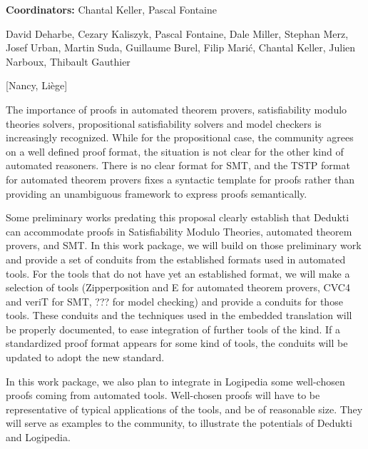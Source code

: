 {\bf Coordinators:} Chantal Keller, Pascal Fontaine

David Deharbe,
Cezary Kaliszyk,
Pascal Fontaine, Dale Miller, Stephan Merz, Josef Urban, Martin Suda,
Guillaume Burel, Filip Marić, Chantal Keller, Julien Narboux, Thibault Gauthier

[Nancy, Liège]

The importance of proofs in automated theorem provers, satisfiability
modulo theories solvers, propositional satisfiability solvers and
model checkers is increasingly recognized.  While for the
propositional case, the community agrees on a well defined proof
format, the situation is not clear for the other kind of automated
reasoners.  There is no clear format for SMT, and the TSTP format for
automated theorem provers fixes a syntactic template for proofs rather
than providing an unambiguous framework to express proofs
semantically.

Some preliminary works predating this proposal clearly establish that
Dedukti can accommodate proofs in Satisfiability Modulo Theories,
automated theorem provers, and SMT.  In this work package, we will
build on those preliminary work and provide a set of conduits from the
established formats used in automated tools. For the tools that do not
have yet an established format, we will make a selection of tools
(Zipperposition and E for automated theorem provers, CVC4 and veriT
for SMT, ??? for model checking) and provide a conduits for those
tools.  These conduits and the techniques used in the embedded
translation will be properly documented, to ease integration of
further tools of the kind.  If a standardized proof format appears for
some kind of tools, the conduits will be updated to adopt the new
standard.

In this work package, we also plan to integrate in Logipedia some
well-chosen proofs coming from automated tools.  Well-chosen proofs
will have to be representative of typical applications of the tools,
and be of reasonable size.  They will serve as examples to the
community, to illustrate the potentials of Dedukti and Logipedia.
